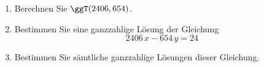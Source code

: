 \begin{aufgabe}[{Klausurvorbereitung 3}]
\begin{enumerate}[label=\alph*)]
\item Berechnen Sie $\ggT(2406, 654)$.
\item Bestimmen Sie eine ganzzahlige Lösung der Gleichung
\[ 2406\,x - 654\,y = 24 \]
\item Bestimmen Sie sämtliche ganzzahlige Lösungen dieser Gleichung.
\end{enumerate}
\end{aufgabe}
